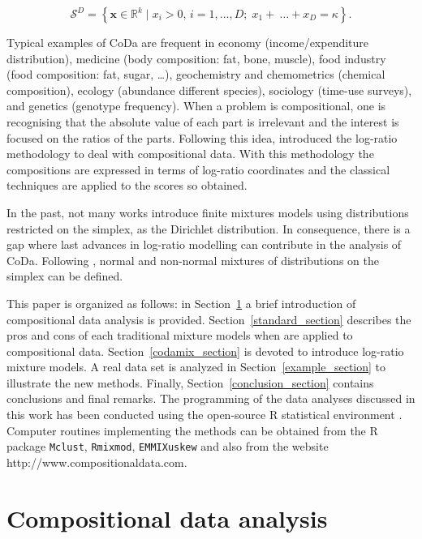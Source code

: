 \documentclass[10pt, a4paper]{article}
\begin{document}
\[
\mathcal{S}^D = \left\{ \textbf{x} \in \mathbb{R}^k \;|\; x_i > 0,\, i=1,\dots, D;\; x_1 + \
\dots + x_D = \kappa \right\}.
\]

Typical examples of CoDa are frequent in economy (income/expenditure distribution), medicine (body composition: fat, bone, muscle), food industry (food composition: fat, sugar, …), geochemistry and chemometrics (chemical composition), ecology (abundance different species), sociology (time-use surveys), and genetics (genotype frequency). 
When a problem is compositional, one is recognising that the absolute value of each part is irrelevant and the interest is focused on the ratios of the parts. Following this idea, \cite{aitchison1986statistical} introduced the log-ratio methodology to deal with compositional data. With this methodology 
the compositions are expressed in terms of log-ratio coordinates and the classical techniques are applied to the scores so obtained.

In the past, not many works \citep[e.g.,][]{albert1982mixtures, bouguila2004unsupervised} introduce finite mixtures models using distributions restricted on the simplex, as the Dirichlet distribution. In consequence, there is a gap where last advances in 
log-ratio modelling can contribute in the analysis of CoDa. Following \cite{mateu2013normal}, normal and non-normal mixtures of distributions on the simplex 
can be defined.

This paper is organized as follows: in Section~\ref{coda_section} a brief introduction of compositional data analysis is provided. Section~\ref{standard_section} describes the pros and cons of each traditional mixture models when are applied to compositional data. Section~\ref{codamix_section} is devoted to introduce log-ratio mixture models. A real data set is analyzed in Section~\ref{example_section} to illustrate the new methods. Finally, Section~\ref{conclusion_section} contains conclusions and final remarks. The programming of the data analyses discussed in this work has been conducted using the open-source R statistical environment \citep{R2014soft}. Computer routines implementing the methods can be obtained from the R package \texttt{Mclust}, \texttt{Rmixmod}, \texttt{EMMIXuskew} and also from the website http://www.compositionaldata.com.






\section{Compositional data analysis}
\label{coda_section}
\end{document}
